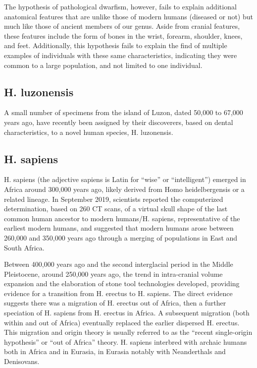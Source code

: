 The hypothesis of pathological dwarfism, however, fails to explain additional anatomical features that are unlike those of modern humans (diseased or not) but much like those of ancient members of our genus. Aside from cranial features, these features include the form of bones in the wrist, forearm, shoulder, knees, and feet. Additionally, this hypothesis fails to explain the find of multiple examples of individuals with these same characteristics, indicating they were common to a large population, and not limited to one individual.

\hypertarget{h.-luzonensis}{%
\subsection{H. luzonensis}\label{h.-luzonensis}}

A small number of specimens from the island of Luzon, dated 50,000 to 67,000 years ago, have recently been assigned by their discoverers, based on dental characteristics, to a novel human species, H. luzonensis.

\hypertarget{h.-sapiens}{%
\subsection{H. sapiens}\label{h.-sapiens}}

H. sapiens (the adjective sapiens is Latin for ``wise'' or ``intelligent'') emerged in Africa around 300,000 years ago, likely derived from Homo heidelbergensis or a related lineage. In September 2019, scientists reported the computerized determination, based on 260 CT scans, of a virtual skull shape of the last common human ancestor to modern humans/H. sapiens, representative of the earliest modern humans, and suggested that modern humans arose between 260,000 and 350,000 years ago through a merging of populations in East and South Africa.

Between 400,000 years ago and the second interglacial period in the Middle Pleistocene, around 250,000 years ago, the trend in intra-cranial volume expansion and the elaboration of stone tool technologies developed, providing evidence for a transition from H. erectus to H. sapiens. The direct evidence suggests there was a migration of H. erectus out of Africa, then a further speciation of H. sapiens from H. erectus in Africa. A subsequent migration (both within and out of Africa) eventually replaced the earlier dispersed H. erectus. This migration and origin theory is usually referred to as the ``recent single-origin hypothesis'' or ``out of Africa'' theory. H. sapiens interbred with archaic humans both in Africa and in Eurasia, in Eurasia notably with Neanderthals and Denisovans.

